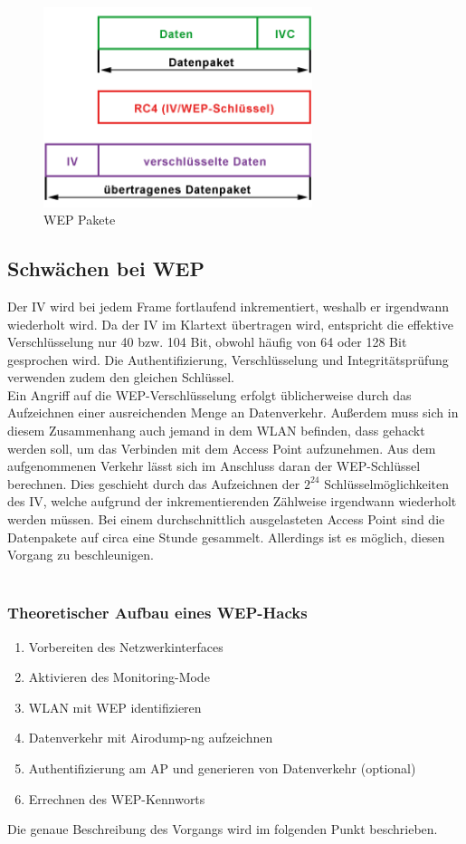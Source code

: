 			\begin{figure}[H]
				\centering
				\includegraphics[width=0.7\textwidth]{images/WLAN/WEPpakete.png}
				\caption{WEP Pakete}
				\label{fig:WEP Pakete}
			\end{figure}

\subsection{Schwächen bei WEP}
Der IV wird bei jedem Frame fortlaufend inkrementiert, weshalb er irgendwann wiederholt
wird. Da der IV im Klartext übertragen wird, entspricht die effektive Verschlüsselung nur 40 bzw. 104 Bit, obwohl häufig von 64 oder 128 Bit gesprochen wird. Die Authentifizierung, Verschlüsselung und Integritätsprüfung verwenden zudem den gleichen Schlüssel. \\
Ein Angriff auf die WEP-Verschlüsselung erfolgt üblicherweise durch das Aufzeichnen einer
ausreichenden Menge an Datenverkehr. Außerdem muss sich in diesem Zusammenhang auch jemand in dem WLAN befinden, dass gehackt werden soll, um das Verbinden mit dem Access Point aufzunehmen.
Aus dem aufgenommenen Verkehr lässt sich im Anschluss daran der WEP-Schlüssel berechnen. Dies geschieht durch das Aufzeichnen der $2^{24}$ Schlüsselmöglichkeiten des IV, welche aufgrund der inkrementierenden Zählweise irgendwann wiederholt werden müssen. Bei einem durchschnittlich ausgelasteten Access Point sind die Datenpakete auf circa eine Stunde gesammelt. Allerdings ist es möglich, diesen Vorgang zu beschleunigen. \\
\\
\subsubsection{Theoretischer Aufbau eines WEP-Hacks}
\begin{enumerate}
	\item Vorbereiten des Netzwerkinterfaces
	\item Aktivieren des Monitoring-Mode
	\item WLAN mit WEP identifizieren
	\item Datenverkehr mit Airodump-ng aufzeichnen
	\item Authentifizierung am AP und generieren von Datenverkehr (optional)
	\item Errechnen des WEP-Kennworts
\end{enumerate}
Die genaue Beschreibung des Vorgangs wird im folgenden Punkt beschrieben.

